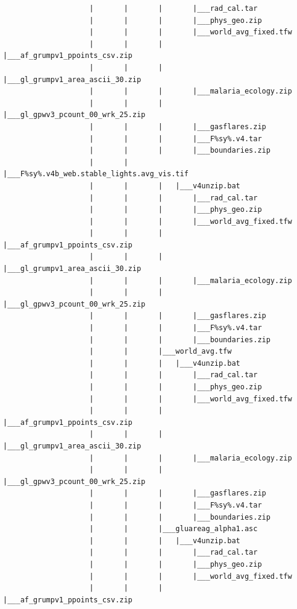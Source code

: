 \documentclass[]{book}
\begin{document}
\begin{verbatim}
                    |       |       |       |___rad_cal.tar
                    |       |       |       |___phys_geo.zip
                    |       |       |       |___world_avg_fixed.tfw
                    |       |       |       |___af_grumpv1_ppoints_csv.zip
                    |       |       |       |___gl_grumpv1_area_ascii_30.zip
                    |       |       |       |___malaria_ecology.zip
                    |       |       |       |___gl_gpwv3_pcount_00_wrk_25.zip
                    |       |       |       |___gasflares.zip
                    |       |       |       |___F%sy%.v4.tar
                    |       |       |       |___boundaries.zip
                    |       |       |___F%sy%.v4b_web.stable_lights.avg_vis.tif
                    |       |       |   |___v4unzip.bat
                    |       |       |       |___rad_cal.tar
                    |       |       |       |___phys_geo.zip
                    |       |       |       |___world_avg_fixed.tfw
                    |       |       |       |___af_grumpv1_ppoints_csv.zip
                    |       |       |       |___gl_grumpv1_area_ascii_30.zip
                    |       |       |       |___malaria_ecology.zip
                    |       |       |       |___gl_gpwv3_pcount_00_wrk_25.zip
                    |       |       |       |___gasflares.zip
                    |       |       |       |___F%sy%.v4.tar
                    |       |       |       |___boundaries.zip
                    |       |       |___world_avg.tfw
                    |       |       |   |___v4unzip.bat
                    |       |       |       |___rad_cal.tar
                    |       |       |       |___phys_geo.zip
                    |       |       |       |___world_avg_fixed.tfw
                    |       |       |       |___af_grumpv1_ppoints_csv.zip
                    |       |       |       |___gl_grumpv1_area_ascii_30.zip
                    |       |       |       |___malaria_ecology.zip
                    |       |       |       |___gl_gpwv3_pcount_00_wrk_25.zip
                    |       |       |       |___gasflares.zip
                    |       |       |       |___F%sy%.v4.tar
                    |       |       |       |___boundaries.zip
                    |       |       |___gluareag_alpha1.asc
                    |       |       |   |___v4unzip.bat
                    |       |       |       |___rad_cal.tar
                    |       |       |       |___phys_geo.zip
                    |       |       |       |___world_avg_fixed.tfw
                    |       |       |       |___af_grumpv1_ppoints_csv.zip

\end{verbatim}
\end{document}
